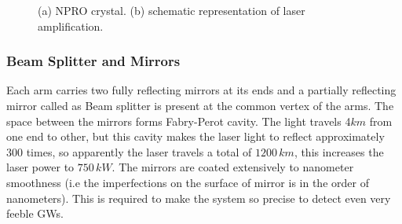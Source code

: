 \begin{figure}[h]
    \centering
    \qquad
    \caption{(a) NPRO crystal. (b) schematic representation of laser amplification. \cite{laser}}
\end{figure}


\subsubsection{Beam Splitter and Mirrors}

Each arm carries two fully reflecting mirrors at its ends and a partially reflecting mirror called as Beam splitter is present at the common vertex of the arms. The space between the mirrors forms Fabry-Perot cavity. The light travels 4$km$ from one end to other, but this cavity makes the laser light to reflect approximately 300 times, so apparently the laser travels a total of $1200\,km$, this increases the laser power to $750\, kW$. The mirrors are coated extensively to nanometer smoothness (i.e the imperfections on the surface of mirror is in the order of nanometers). This is required to make the system so precise to detect even very feeble GWs. \cite{mirrors}

